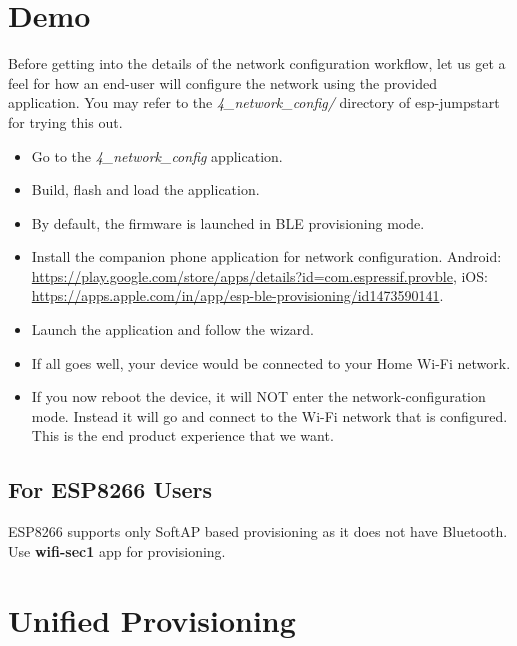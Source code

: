 \documentclass[main.tex]{subfiles}
\begin{document}
\section{Demo}
Before getting into the details of the network configuration workflow, let us get a feel for how an end-user will configure the network using the provided application.
You may refer to the \textit{4\_network\_config/} directory of esp-jumpstart for trying this out.

\begin{itemize}
    \item Go to the \textit{4\_network\_config} application.
    \item Build, flash and load the application.
    \item By default, the firmware is launched in BLE provisioning mode.
    \item Install the companion phone application for network configuration. Android: \url{https://play.google.com/store/apps/details?id=com.espressif.provble}, iOS: \url{https://apps.apple.com/in/app/esp-ble-provisioning/id1473590141}.
    \item Launch the application and follow the wizard.
\end{itemize}



\begin{itemize}
    \item If all goes well, your device would be connected to your Home Wi-Fi network.
    \item If you now reboot the device, it will NOT enter the network-configuration mode. Instead it will go and connect to the Wi-Fi network that is configured. This is the end product experience that we want.
\end{itemize}

\subsection{For ESP8266 Users}\label{sec:for_esp8266_users}
ESP8266 supports only SoftAP based provisioning as it does not have Bluetooth. Use \textbf{wifi-sec1} app for provisioning.

\section{Unified Provisioning}\label{sec:unified_prov}
\end{document}
